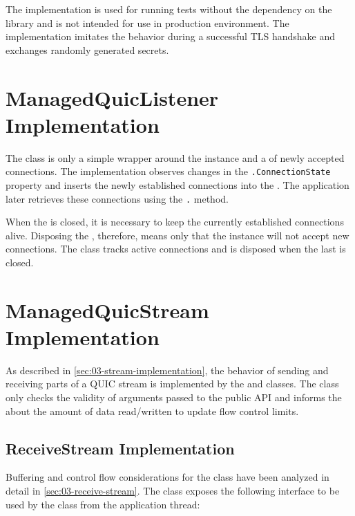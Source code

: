 The \MockTls{} implementation is used for running tests without the dependency on the \libopenssl{}
library and is not intended for use in production environment. The implementation imitates the
\OpenSslTls{} behavior during a successful TLS handshake and exchanges randomly generated
secrets.

\section{ManagedQuicListener Implementation}

The \ManagedQuicListener{} class is only a simple wrapper around the \QuicServerSocketContext{}
instance and a \ChannelOf{\ManagedQuicConnection{}} of newly accepted connections. The
\QuicServerSocketContext{} implementation observes changes in the
\texttt{\ManagedQuicConnection{}.ConnectionState} property and inserts the newly established
connections into the . The application later retrieves these connections using the
\texttt{\ManagedQuicListener{}.} method.

When the \ManagedQuicListener{} is closed, it is necessary to keep the currently established
connections alive. Disposing the \ManagedQuicListener{}, therefore, means only that the
\QuicServerSocketContext{} instance will not accept new connections. The \QuicServerSocketContext{}
class tracks active connections and is disposed when the last \ManagedQuicConnection{} is closed.

\section{ManagedQuicStream Implementation}

As described in \autoref{sec:03-stream-implementation}, the behavior of sending and receiving parts
of a QUIC stream is implemented by the \ReceiveStream{} and \SendStream{} classes. The
\ManagedQuicStream{} class only checks the validity of arguments passed to the public API and
informs the \ManagedQuicConnection{} about the amount of data read/written to update flow control
limits.

\subsection{ReceiveStream Implementation}

Buffering and control flow considerations for the \ReceiveStream{} class have been analyzed in
detail in \autoref{sec:03-receive-stream}. The \ReceiveStream{} class exposes the following
interface to be used by the \ManagedQuicStream{} class from the application thread:

